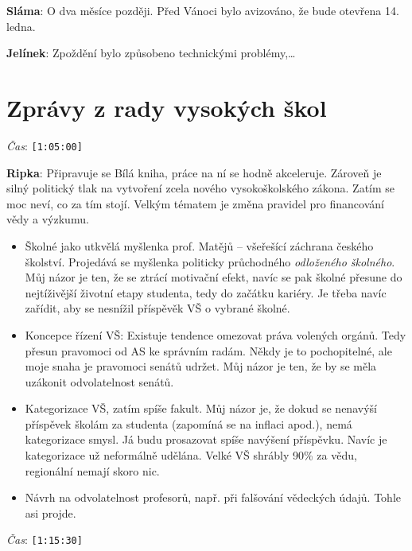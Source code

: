 \documentclass[a4paper,10pt,notitlepage]{article}
\newcommand{\ts}[1]{\texttt{[#1]}}
\newcommand{\tsp}[1]{\noindent \textit{Čas}: \ts{#1}}
\newcommand{\cl}[1]{\noindent \textbf{#1}:}
\begin{document}
\cl{Sláma} O dva měsíce později. Před Vánoci bylo avizováno, že bude otevřena 14. ledna.

\cl{Jelínek} Zpoždění bylo způsobeno technickými problémy,\dots



\newpage\section{Zprávy z rady vysokých škol}

\tsp{1:05:00}

\cl{Ripka} Připravuje se Bílá kniha, práce na ní se hodně akceleruje. Zároveň je silný politický tlak na vytvoření zcela nového vysokoškolského zákona. Zatím se moc neví, co za tím stojí. Velkým tématem je změna pravidel pro financování vědy a výzkumu.

\begin{itemize}
\item Školné jako utkvělá myšlenka prof. Matějů -- všeřešící záchrana českého školství. Projedává se myšlenka politicky průchodného \textit{odloženého školného}. Můj názor je ten, že se ztrácí motivační efekt, navíc se pak školné přesune do nejtíživější životní etapy studenta, tedy do začátku kariéry. Je třeba navíc zařídit, aby se nesnížil příspěvěk VŠ o vybrané školné.

\item Koncepce řízení VŠ: Existuje tendence omezovat práva volených orgánů. Tedy přesun pravomoci od AS ke správním radám. Někdy je to pochopitelné, ale moje snaha je pravomoci senátů udržet. Můj názor je ten, že by se měla uzákonit odvolatelnost senátů.

\item Kategorizace VŠ, zatím spíše fakult. Můj názor je, že dokud se nenavýší příspěvek školám za studenta (zapomíná se na inflaci apod.), nemá kategorizace smysl. Já budu prosazovat spíše navýšení příspěvku. Navíc je kategorizace už neformálně udělána. Velké VŠ shrábly 90\% za vědu, regionální nemají skoro nic.

\item Návrh na odvolatelnost profesorů, např. při falšování vědeckých údajů. Tohle asi projde.
\end{itemize}

\tsp{1:15:30}
\end{document}
